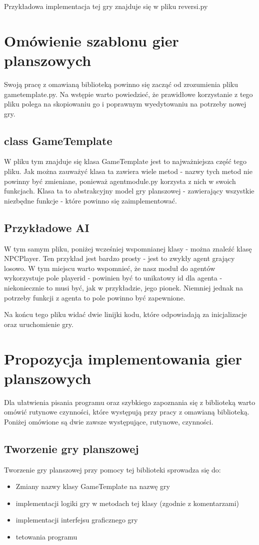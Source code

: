 \documentclass[polish,shortabstract,inz]{iithesis}
\begin{document}
Przykładowa implementacja tej gry znajduje się w pliku reversi.py


\section{Omówienie szablonu gier planszowych}
Swoją pracę z omawianą biblioteką powinno się zacząć od zrozumienia pliku game\textunderscore template.py.
Na wstępie warto powiedzieć, że prawidłowe korzystanie z tego pliku polega na skopiowaniu go i poprawnym wyedytowaniu na potrzeby nowej gry.

\subsection{class GameTemplate}
W pliku tym znajduje się klasa GameTemplate jest to najważniejsza część tego pliku.
Jak można zauważyć klasa ta zawiera wiele metod - nazwy tych metod nie powinny być zmieniane, ponieważ agent\textunderscore module.py korzysta z nich w swoich funkcjach.
Klasa ta to abstrakcyjny model gry planszowej - zawierający wszystkie niezbędne funkcje - które powinno się zaimplementować.

\subsection{Przykładowe AI}
W tym samym pliku, poniżej wcześniej wspomnianej klasy - można znaleźć klasę NPCPlayer. Ten przykład jest bardzo prosty - jest to zwykły agent grający losowo.
W tym miejscu warto wspomnieć, że nasz moduł do agentów wykorzystuje pole player\textunderscore id - powinien być to unikatowy id dla agenta - niekoniecznie to musi być, jak w przykładzie, jego pionek.
Niemniej jednak na potrzeby funkcji z agenta to pole powinno być zapewnione.

Na końcu tego pliku widać dwie linijki kodu, które odpowiadają za inicjalizacje oraz uruchomienie gry.
\section{Propozycja implementowania gier planszowych}
Dla ułatwienia pisania programu oraz szybkiego zapoznania się z biblioteką warto omówić rutynowe czynności, które występują przy pracy z omawianą biblioteką.
Poniżej omówione są dwie zawsze występujące, rutynowe, czynności.
\subsection{Tworzenie gry planszowej}
Tworzenie gry planszowej przy pomocy tej biblioteki sprowadza się do:
\begin{itemize}
  \item Zmiany nazwy klasy GameTemplate na nazwę gry
  \item implementacji logiki gry w metodach tej klasy (zgodnie z komentarzami)
  \item implementacji interfejsu graficznego gry
  \item tetowania programu
\end{itemize}
\end{document}
